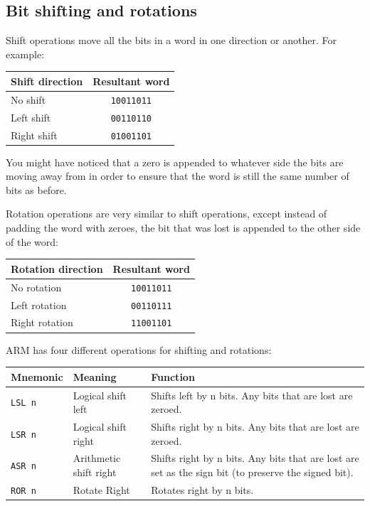 \documentclass{article}
\begin{document}
\subsection{Bit shifting and rotations}

Shift operations move all the bits in a word in one direction or another. For
example:

\begin{center}
	\begin{tabular}{|l|c|}
		\hline
		{\bf Shift direction} & {\bf Resultant word}\\ \hline
		No shift & {\tt 10011011}\\ \hline
		Left shift & {\tt 00110110}\\ \hline
		Right shift & {\tt 01001101}\\ \hline
	\end{tabular}
\end{center}


You might have noticed that a zero is appended to whatever side the bits are
moving away from in order to ensure that the word is still the same number of
bits as before.

Rotation operations are very similar to shift operations, except instead of
padding the word with zeroes, the bit that was lost is appended to the other
side of the word:

\begin{center}
	\begin{tabular}{|l|c|}
		\hline
		{\bf Rotation direction} & {\bf Resultant word}\\ \hline
		No rotation & {\tt 10011011}\\ \hline
		Left rotation & {\tt 00110111}\\ \hline
		Right rotation & {\tt 11001101}\\ \hline
	\end{tabular}
\end{center}

ARM has four different operations for shifting and rotations:

\begin{center}
	\begin{tabularx}{0.8\textwidth}{|l|l|X|}
		\hline
		{\bf Mnemonic} & {\bf Meaning} & {\bf Function}\\ \hline
		{\tt LSL n} & Logical shift left & Shifts left by n bits. Any bits that are lost are zeroed.\\ \hline
		{\tt LSR n} & Logical shift right &  Shifts right by n bits. Any bits that are lost are zeroed.\\ \hline
		{\tt ASR n} & Arithmetic shift right & Shifts right by n bits. Any bits that are lost are set as the sign bit (to preserve the signed bit).\\ \hline
		{\tt ROR n} & Rotate Right & Rotates right by n bits.\\ \hline
	\end{tabularx}
\end{center}
\end{document}
